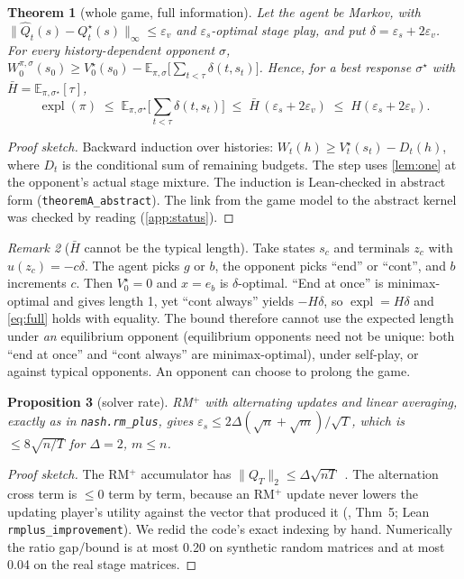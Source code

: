 \documentclass[10pt]{article}
\theoremstyle{plain}
\newtheorem{theorem}{Theorem}
\newtheorem{proposition}[theorem]{Proposition}
\theoremstyle{definition}
\theoremstyle{remark}
\newtheorem{remark}[theorem]{Remark}
\newcommand{\E}{\mathbb{E}}
\newcommand{\Hbar}{\bar H}
\newcommand{\epss}{\varepsilon_s}
\newcommand{\epsv}{\varepsilon_v}
\newcommand{\Qhat}{\hat Q}
\newcommand{\Qstar}{Q^\star}
\newcommand{\Vstar}{V^\star}
\DeclareMathOperator{\expl}{expl}
\begin{document}
\begin{theorem}[whole game, full information]\label{thm:full}
Let the agent be Markov, with $\lVert\Qhat_t(s)-\Qstar_t(s)\rVert_\infty\le\epsv$ and $\epss$-optimal stage play, and put $\delta=\epss+2\epsv$. For every history-dependent opponent $\sigma$,
$W^{\pi,\sigma}_0(s_0)\ge\Vstar_0(s_0)-\E_{\pi,\sigma}\big[\sum_{t<\tau}\delta(t,s_t)\big]$. Hence, for a best response $\sigma^\star$ with $\Hbar=\E_{\pi,\sigma^\star}[\tau]$,
\begin{equation}\label{eq:full}
\expl(\pi)\;\le\;\E_{\pi,\sigma^\star}\Big[\sum_{t<\tau}\delta(t,s_t)\Big]\;\le\;\Hbar\,(\epss+2\epsv)\;\le\;H(\epss+2\epsv).
\end{equation}
\end{theorem}
\begin{proof}[Proof sketch]
Backward induction over histories: $W_t(h)\ge\Vstar_t(s_t)-D_t(h)$, where $D_t$ is the conditional sum of remaining budgets. The step uses \cref{lem:one} at the opponent's actual stage mixture. The induction is Lean-checked in abstract form (\texttt{theoremA\_abstract}). The link from the game model to the abstract kernel was checked by reading (\cref{app:status}).
\end{proof}

\begin{remark}[$\Hbar$ cannot be the typical length]\label{rem:hbar}
Take states $s_c$ and terminals $z_c$ with $u(z_c)=-c\delta$. The agent picks $g$ or $b$, the opponent picks ``end'' or ``cont'', and $b$ increments $c$. Then $\Vstar_0=0$ and $x=e_b$ is $\delta$-optimal. ``End at once'' is minimax-optimal and gives length 1, yet ``cont always'' yields $-H\delta$, so $\expl=H\delta$ and \eqref{eq:full} holds with equality. The bound therefore cannot use the expected length under \emph{an} equilibrium opponent (equilibrium opponents need not be unique: both ``end at once'' and ``cont always'' are minimax-optimal), under self-play, or against typical opponents. An opponent can choose to prolong the game.
\end{remark}

\begin{proposition}[solver rate]\label{prop:rm}
RM$^+$ with alternating updates and linear averaging, exactly as in \texttt{nash.rm\_plus}, gives $\epss\le2\Delta(\sqrt n+\sqrt m)/\sqrt T$, which is $\le8\sqrt{n/T}$ for $\Delta=2$, $m\le n$.
\end{proposition}
\begin{proof}[Proof sketch]
The RM$^+$ accumulator has $\lVert Q_T\rVert_2\le\Delta\sqrt{nT}$~\cite{Tam14}. The alternation cross term is $\le0$ term by term, because an RM$^+$ update never lowers the updating player's utility against the vector that produced it (\cite{BMS19}, Thm~5; Lean \texttt{rmplus\_improvement}). We redid the code's exact indexing by hand. Numerically the ratio gap/bound is at most 0.20 on synthetic random matrices and at most 0.04 on the real stage matrices.
\end{proof}
\end{document}
